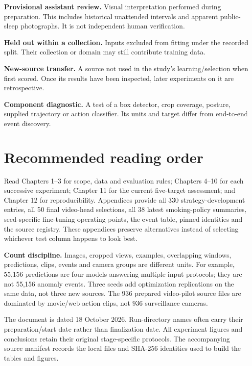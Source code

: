 \textbf{Provisional assistant review.} Visual interpretation performed during preparation. This includes historical unattended intervals and apparent public-sleep photographs. It is not independent human verification.

\textbf{Held out within a collection.} Inputs excluded from fitting under the recorded split. Their collection or domain may still contribute training data.

\textbf{New-source transfer.} A source not used in the study's learning/selection when first scored. Once its results have been inspected, later experiments on it are retrospective.

\textbf{Component diagnostic.} A test of a box detector, crop coverage, posture, supplied trajectory or action classifier. Its units and target differ from end-to-end event discovery.

\section*{Recommended reading order}
Read Chapters 1--3 for scope, data and evaluation rules; Chapters 4--10 for each successive experiment; Chapter 11 for the current five-target assessment; and Chapter 12 for reproducibility. Appendices provide all 330 strategy-development entries, all 50 final video-head selections, all 38 latest smoking-policy summaries, seed-specific fine-tuning operating points, the event table, pinned identities and the source registry. These appendices preserve alternatives instead of selecting whichever test column happens to look best.

\textbf{Count discipline.} Images, cropped views, examples, overlapping windows, predictions, clips, events and camera groups are different units. For example, 55,156 predictions are four models answering multiple input protocols; they are not 55,156 anomaly events. Three seeds add optimization replications on the same data, not three new sources. The 936 prepared video-pilot source files are dominated by movie/web action clips, not 936 surveillance cameras.

The document is dated 18 October 2026. Run-directory names often carry their preparation/start date rather than finalization date. All experiment figures and conclusions retain their original stage-specific protocols. The accompanying source manifest records the local files and SHA-256 identities used to build the tables and figures.
